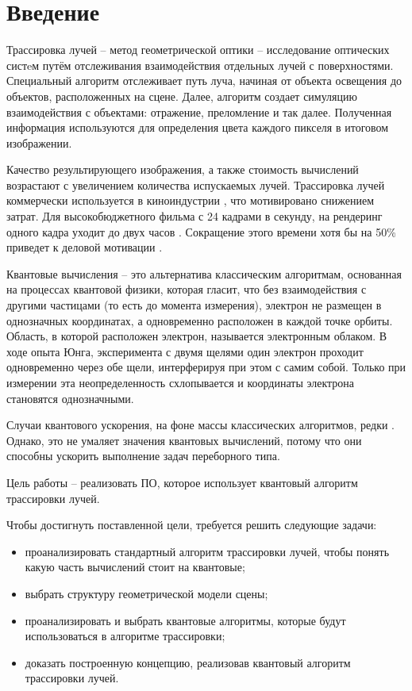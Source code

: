 \chapter*{Введение}

Трассировка лучей -- метод геометрической оптики -- исследование оптических систeм путём отслеживания взаимодействия отдельных лучей с поверхностями. Специальный алгоритм отслеживает путь луча, начиная от объекта освещения до объектов, расположенных на сцене. Далее, алгоритм создает симуляцию взаимодействия с объектами: отражение, преломление и так далее. Полученная информация используются для определения цвета каждого пикселя в итоговом изображении. 

Качество результирующего изображения, а также стоимость вычислений возрастают с увеличением количества испускаемых лучей. Трассировка лучей коммерчески используется в киноиндустрии \cite{path-traced-movies}, что мотивировано снижением затрат. Для высокобюджетного фильма с 24 кадрами в секунду, на рендеринг одного кадра уходит до двух часов \cite{path-traced-movies}. Сокращение этого времени хотя бы на 50\% приведет к деловой мотивации \cite{path-traced-movies}. 

Квантовые вычисления -- это альтернатива классическим алгоритмам, основанная на процессах квантовой физики, которая гласит, что без взаимодействия с другими частицами (то есть до момента измерения), электрон не
размещен в однозначных координатах, а одновременно расположен
в каждой точке орбиты. Область, в которой расположен электрон, называется электронным облаком. В ходе опыта Юнга, эксперимента с двумя щелями один электрон проходит одновременно через обе щели, интерферируя при этом с самим собой. Только при измерении эта неопределенность схлопывается и координаты электрона становятся однозначными.

Случаи квантового ускорения, на фоне массы классических алгоритмов, редки \cite{quantum-computers-speed-up}. Однако, это не умаляет значения квантовых вычислений, потому что они способны ускорить выполнение задач переборного типа. 

Цель работы -- реализовать ПО, которое
использует квантовый алгоритм трассировки лучей.

Чтобы достигнуть поставленной цели, требуется решить следующие задачи:

\begin{itemize}
    \item проанализировать стандартный алгоритм трассировки лучей, чтобы
понять какую часть вычислений стоит на квантовые;
    \item выбрать структуру геометрической модели сцены;
    \item проанализировать и выбрать квантовые алгоритмы, которые будут использоваться в алгоритме трассировки;
    \item доказать построенную концепцию, реализовав квантовый алгоритм трассировки лучей.
\end{itemize}
